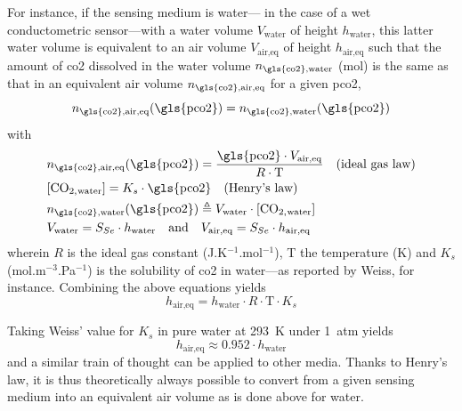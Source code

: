 For instance, if the sensing medium is water---\eg{} in the case of a wet conductometric sensor---with a water volume $V_\text{water}$ of height $h_\text{water}$, this latter water volume is equivalent to an air volume $V_\text{air,eq}$ of height $h_\text{air,eq}$ such that the amount of \gls{co2} dissolved in the water volume $n_\text{\gls{co2},water}$ (mol) is the same as that in an equivalent air volume $n_\text{\gls{co2},air,eq}$ for a given \gls{pco2}, \ie{}
\begin{equation}
	n_\text{\gls{co2},air,eq}(\text{\gls{pco2}}) = n_\text{\gls{co2},water}(\text{\gls{pco2}})
\end{equation}
with
\begin{equation}
	\begin{aligned}
		&n_\text{\gls{co2},air,eq}(\text{\gls{pco2}}) = \frac{\text{\gls{pco2}} \cdot V_\text{air,eq}}{R\cdot \text{T}} \quad \text{(ideal gas law)}\\
		&\ce{[CO_{2,water}]} = K_s \cdot \text{\gls{pco2}} \quad \text{(Henry's law)}\\
		&n_\text{\gls{co2},water}(\text{\gls{pco2}}) \triangleq V_\text{water} \cdot \ce{[CO_{2,water}]}\\
		&V_\text{water} = S_{Se} \cdot h_\text{water} \quad \text{and} \quad V_\text{air,eq} = S_{Se} \cdot h_\text{air,eq}\\
	\end{aligned}
\end{equation}
wherein $R$ is the ideal gas constant (J.K$^{-1}$.mol$^{-1}$), T the temperature (K) and $K_s$ (mol.m$^{-3}$.Pa$^{-1}$) is the solubility of \gls{co2} in water---as reported by Weiss\cite{weiss1974}, for instance. Combining the above equations yields
\begin{equation}
	h_\text{air,eq} = h_\text{water} \cdot R \cdot \text{T} \cdot K_s
\end{equation}

Taking Weiss' value for $K_s$ in pure water at 293~K under 1~atm yields
\begin{equation}
	h_\text{air,eq} \approx 0.952 \cdot h_\text{water}
\end{equation}
and a similar train of thought can be applied to other media. Thanks to Henry's law, it is thus theoretically always possible to convert from a given sensing medium into an equivalent air volume as is done above for water.

